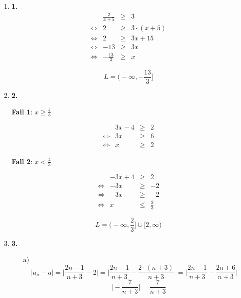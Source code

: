 \documentclass [a4paper,11pt]{article}
\author{\authorinfo}
\title{\titleinfo}
\date{\today}
\begin{document}
\maketitle
	\begin {enumerate}
		\item[\textbf{1.}]
			$$\begin{array}{lrcl}
							& \frac{2}{x+5} &\geq& 3 \\
			\Leftrightarrow & 2 			&\geq& 3 \cdot (x + 5) \\
			\Leftrightarrow & 2 			&\geq& 3x + 15 \\
			\Leftrightarrow & -13 			&\geq& 3x \\
			\Leftrightarrow & -\frac{13}{3} &\geq& x
			\end{array}$$

			$$L = \Big(-\infty,-\frac{13}{3}\Big]$$

		\item[\textbf{2.}]
			\begin{multicols}{2}
				\textbf{Fall 1}: $x \geq \frac{4}{3}$

				$$\begin{array}{lrcl}
								& 3x - 4 &\geq& 2 \\
				\Leftrightarrow & 3x &\geq& 6 \\
				\Leftrightarrow & x &\geq& 2
				\end{array}$$

				\textbf{Fall 2}: $x < \frac{4}{3}$

				$$\begin{array}{lrcl}
								& - 3x + 4 &\geq& 2 \\
				\Leftrightarrow & - 3x &\geq& -2 \\
				\Leftrightarrow & - 3x &\geq& -2 \\
				\Leftrightarrow & x &\leq& \frac{2}{3}
				\end{array}$$
			\end{multicols}

			$$L=\Big(-\infty, \frac{2}{3}\Big] \cup \Big[2, \infty\Big)$$

		\item[\textbf{3.}]
			\begin{enumerate}
				\item[a)]
					\[|a_n - a| = \Big| \frac{2n-1}{n+3}-2 \Big| =\Big| \frac{2n-1}{n+3}-\frac{2 \cdot (n+3)}{n+3}\Big|= \Big| \frac{2n-1}{n+3}-\frac{2n+6}{n+3} \Big|\]
					\[ = \Big|-\frac{7}{n+3} \Big| =\frac{7}{n+3}\]


\end{enumerate}
\end{enumerate}
\end{document}
